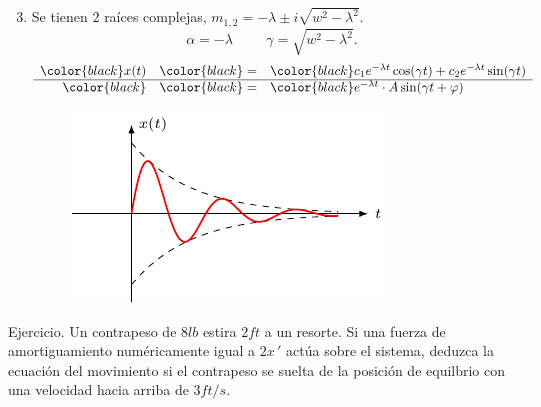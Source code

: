 \documentclass{beamer}
\begin{document}
\begin{frame}[t]
	\begin{block}{}
		\begin{enumerate}
			\setcounter{enumi}{2}
		\item {} Se tienen \(2\) raíces complejas, \(m_{1,2} = - \lambda \pm i \sqrt{w^2- \lambda ^2}\).
			\[
				\alpha = - \lambda \hspace{1cm} \gamma = \sqrt{w^2-  \lambda ^2}.
			\]
				\color{red} \vspace{-5mm}
			\[
				\begin{array}{rcl}
					\color{black} x(t) & \color{black} = & \color{black} c_1e^{- \lambda t} \cos (\gamma t) +c_2e^{- \lambda t} \sin (\gamma t) \\ \hline
					\color{black} & \color{black} = & \color{black} e^{- \lambda t} \cdot A \sin (\gamma t+ \varphi)
				\end{array}
			\]
				\begin{figure}[hbtp!]
					\centering
					\includegraphics[width= 0.8 \linewidth]{IMAGENES/5/tikz.pdf}
				\end{figure}
		\end{enumerate}
	\end{block}
\end{frame}

\begin{frame}[t]
	\begin{alertblock}{Ejercicio.}
		Un contrapeso de \(8lb\) estira \(2ft\) a un resorte. Si una fuerza de amortiguamiento numéricamente igual a \(2x\,'\) actúa sobre el sistema, deduzca la ecuación del movimiento si el contrapeso se suelta de la posición de equilbrio con una velocidad hacia arriba de \(3ft/s\).
	\end{alertblock}
\end{frame}
\begin{frame}[t]
\end{frame}
\end{document}
